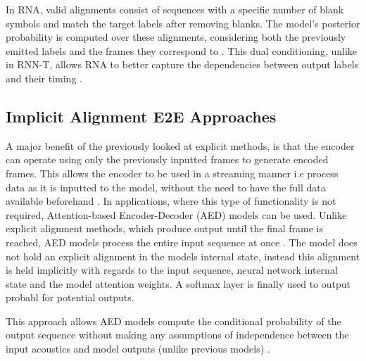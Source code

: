 \documentclass[10pt, english]{article}
\begin{document}
In RNA, valid alignments consist of sequences with a specific number of blank symbols and match the target labels after removing blanks. The model’s posterior probability is computed over these alignments, considering both the previously emitted labels and the frames they correspond to \citep{graves2012sequencetransductionrecurrentneural}. This dual conditioning, unlike in RNN-T, allows RNA to better capture the dependencies between output labels and their timing \citep{PrabhavalkarEnd-to-End2024}.



\subsection{Implicit Alignment E2E Approaches}
A major benefit of the previously looked at explicit methods, is that the encoder can operate using only the previously inputted frames to generate encoded frames. This allows the encoder to be used in a streaming manner i.e process data as it is inputted to the model, without the need to have the full data available beforehand \citep{PrabhavalkarEnd-to-End2024}.
In applications, where this type of functionality is not required, Attention-based Encoder-Decoder (AED) \citep{NIPS2015_1068c6e4} models can be used. Unlike explicit alignment methods, which produce output until the final frame is reached, AED models process the entire input sequence at once \citep{NIPS2015_1068c6e4}. The model does not hold an explicit alignment in the models internal state, instead this alignment is held implicitly with regards to the input sequence, neural network internal state and the model attention weights. A softmax layer is finally used to output probabl for potential outputs.

This approach allows AED models compute the conditional probability of the output sequence without making any assumptions of independence between the input acoustics and model outputs (unlike previous models) \citep{PrabhavalkarEnd-to-End2024}.


\clearpage
\printbibliography
\end{document}
